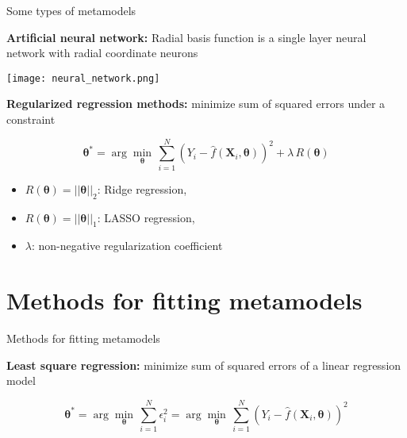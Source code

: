 \documentclass{beamer}
\begin{document}

\begin{frame}[t]{Some types of metamodels}

{\bf Artificial neural network:}
Radial basis function is a single layer neural network with radial coordinate neurons
\begin{center}
 \texttt{[image: neural\_network.png]}
\end{center}

\end{frame}


\begin{frame}

{\bf Regularized regression methods:} minimize sum of squared errors under a constraint

\[
\boldsymbol{\theta}^* = \arg \min_{\boldsymbol{\theta}} \, \sum_{i=1}^N (Y_i - \hat{f}(\boldsymbol{X}_i, \boldsymbol{\theta}))^2 + \lambda \, R(\boldsymbol{\theta})
\]

\begin{itemize}
\item $R(\boldsymbol{\theta}) = ||\boldsymbol{\theta}||_2$: Ridge regression,
\item $R(\boldsymbol{\theta}) = ||\boldsymbol{\theta}||_1$: LASSO regression,
\item $\lambda$: non-negative regularization coefficient
\end{itemize}

\end{frame}
  

\section{Methods for fitting metamodels}
\begin{frame}[t]{Methods for fitting metamodels}

{\bf Least square regression:} minimize sum of squared errors of a linear regression model

\[
\boldsymbol{\theta}^* = \arg \min_{\boldsymbol{\theta}} \, \sum_{i=1}^N \epsilon_i^2 =\arg \min_{\boldsymbol{\theta}} \, \sum_{i=1}^N (Y_i - \hat{f}(\boldsymbol{X}_i, \boldsymbol{\theta}))^2
\]

\end{frame}

\end{document}
